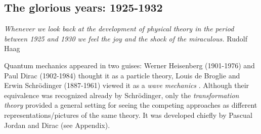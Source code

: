 \documentclass[12pt]{article}
\begin{document}
\smallskip

\subsection{The glorious years: 1925-1932}

\begin{flushright}
{\it Whenever we look back at the development of physical theory
                      in the period between 1925 and 1930
          we feel the joy and the shock of the miraculous.}
                                               Rudolf Haag

\end{flushright}

Quantum mechanics appeared in two guises: Werner Heisenberg (1901-1976) and
Paul Dirac (1902-1984) thought it as a particle theory, Louis de Broglie and
Erwin Schr\"odinger (1887-1961) viewed it as a {\it wave mechanics} \cite{Sch}.
 Although their equivalence was recognized already by Schr\"odinger, only the
{\it transformation theory} provided a general setting for seeing the competing
approaches as different representations/pictures of the same theory. It was
developed chiefly by Pascual Jordan and Dirac (see Appendix).
\end{document}
